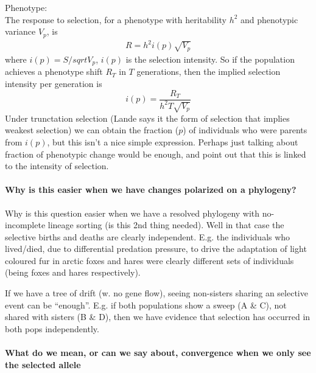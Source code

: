 \documentclass[a4paper,10pt]{article}
\begin{document}
Phenotype:\\
The response to selection, for a phenotype with heritability $h^2$ and
phenotypic variance $V_p$, is 
\begin{align}
R = h^2 i(p) \sqrt{V_p}
\end{align}
where $i(p)=S/sqrt{V_p}$, $i(p)$ is the selection intensity. So if the
population achieves a phenotype shift $R_T$ in $T$ generations, then
the implied selection intensity per generation is 
\begin{equation}
i(p) = \frac{R_T}{h^2 T \sqrt{V_p}}
\end{equation}  
Under trunctation selection (Lande says it the form of selection that
implies weakest selection) we can obtain the fraction ($p$) of individuals
who were parents from $i(p)$, but this isn't a nice simple
expression. Perhaps just talking about fraction of phenotypic change would be
enough, and point out that this is linked to the intensity of
selection. 

\paragraph{Why is this easier when we have changes polarized on a phylogeny?}

Why is this question easier when we have a resolved phylogeny with
no-incomplete lineage sorting (is this 2nd thing needed).
Well in that case the selective births and deaths are clearly
independent. E.g. the individuals who lived/died, due to differential
predation pressure, to drive the adaptation of light coloured fur in
arctic foxes and hares were clearly different sets of individuals
(being foxes and hares respectively). 



If we have a tree of drift (w. no gene flow), seeing non-sisters sharing an selective
event can be ``enough''. E.g. if both populations show a sweep (A \& C), not
shared with sisters (B \& D), then we have evidence that selection has occurred
in both pops independently. 

\paragraph{What do we mean, or can we say about, convergence when we only see the selected allele}
\end{document}
